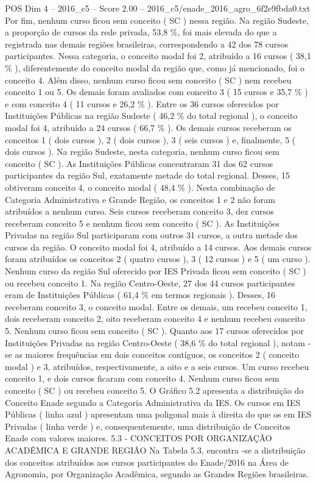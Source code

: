 \begin{textsample}{POS Dim 4 – 2016\_c5 – Score 2.00 – 2016\_c5/enade\_2016\_agro\_6f2e9fbda0.txt}
Por fim, nenhum curso ficou sem conceito ( SC ) nessa região.
Na região Sudeste, a proporção de cursos da rede privada, 53,8 \%, foi mais elevada do que a registrada nas demais regiões brasileiras, correspondendo a 42 dos 78 cursos participantes.
Nessa categoria, o conceito modal foi 2, atribuído a 16 cursos ( 38,1 \% ), diferentemente do conceito modal da região que, como já mencionado, foi o conceito 4.
Além disso, nenhum curso ficou sem conceito ( SC ) nem recebeu conceito 1 ou 5.
Os demais foram avaliados com conceito 3 ( 15 cursos e 35,7 \% ) e com conceito 4 ( 11 cursos e 26,2 \% ).
Entre os 36 cursos oferecidos por Instituições Públicas na região Sudeste ( 46,2 \% do total regional ), o conceito modal foi 4, atribuído a 24 cursos ( 66,7 \% ).
Os demais cursos receberam os conceitos 1 ( dois cursos ), 2 ( dois cursos ), 3 ( seis cursos ) e, finalmente, 5 ( dois cursos ).
Na região Sudeste, nesta categoria, nenhum curso ficou sem conceito ( SC ).
As Instituições Públicas concentraram 31 dos 62 cursos participantes da região Sul, exatamente metade do total regional.
Desses, 15 obtiveram conceito 4, o conceito modal ( 48,4 \% ).
Nesta combinação de Categoria Administrativa e Grande Região, os conceitos 1 e 2 não foram atribuídos a nenhum curso.
Seis cursos receberam conceito 3, dez cursos receberam conceito 5 e nenhum ficou sem conceito ( SC ).
As Instituições Privadas na região Sul participaram com outros 31 cursos, a outra metade dos cursos da região.
O conceito modal foi 4, atribuído a 14 cursos.
Aos demais cursos foram atribuídos os conceitos 2 ( quatro cursos ), 3 ( 12 cursos ) e 5 ( um curso ).
Nenhum curso da região Sul oferecido por IES Privada ficou sem conceito ( SC ) ou recebeu conceito 1.
Na região Centro-Oeste, 27 dos 44 cursos participantes eram de Instituições Públicas ( 61,4 \% em termos regionais ).
Desses, 16 receberam conceito 3, o conceito modal.
Entre os demais, um recebeu conceito 1, dois receberam conceito 2, oito receberam conceito 4 e nenhum recebeu conceito 5.
Nenhum curso ficou sem conceito ( SC ).
Quanto aos 17 cursos oferecidos por Instituições Privadas na região Centro-Oeste ( 38,6 \% do total regional ), notam -se as maiores frequências em dois conceitos contíguos, os conceitos 2 ( conceito modal ) e 3, atribuídos, respectivamente, a oito e a seis cursos.
Um curso recebeu conceito 1, e dois cursos ficaram com conceito 4.
Nenhum curso ficou sem conceito ( SC ) ou recebeu conceito 5.
O Gráfico 5.2 apresenta a distribuição do Conceito Enade segundo a Categoria Administrativa da IES.
Os cursos em IES Públicas ( linha azul ) apresentam uma poligonal mais à direita do que os em IES Privadas ( linha verde ) e, consequentemente, uma distribuição de Conceitos Enade com valores maiores. 5.3 - CONCEITOS POR ORGANIZAÇÃO ACADÊMICA E GRANDE REGIÃO Na Tabela 5.3, encontra -se a distribuição dos conceitos atribuídos aos cursos participantes do Enade/2016 na Área de Agronomia, por Organização Acadêmica, segundo as Grandes Regiões brasileiras.

\end{textsample}
